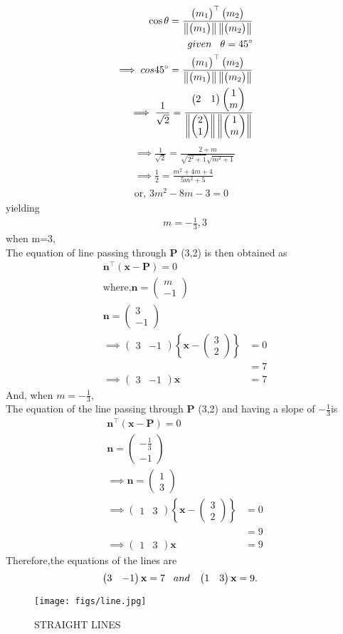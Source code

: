 \documentclass[10pt,a4paper]{report}
\newcommand{\myvec}[1]{\ensuremath{\begin{pmatrix}#1\end{pmatrix}}}
\let\vec\mathbf
\providecommand{\cbrak}[1]{\ensuremath{\left\{#1\right\}}}
\providecommand{\norm}[1]{\left\lVert#1\right\rVert}
\let\vec\mathbf
\renewcommand{\vec}[1]{\textbf{#1}}
\begin{document}
\begin{align}
\cos \theta = \frac{\myvec{m_1}^\top \myvec{m_2}}{\norm{\myvec{m_1}}\norm{\myvec{m_2}}}\\
given\hspace{0.3cm}  \theta = 45^\circ\\
\implies cos45^\circ =  \frac{\myvec{m_1}^\top \myvec{m_2}}{\norm{\myvec{m_1}}\norm{\myvec{m_2}}}\\
\implies \frac{1}{\sqrt{2}} = \frac{\myvec{2 & 1} \myvec{1\\m}}{\norm{\myvec{2\\1}}\norm{\myvec{1\\m}}}
\end{align}
\begin{align}
\implies \frac{1}{\sqrt{2}}=\frac{2+m}{\sqrt{2^2 + 1}\sqrt{m^2 + 1}}\\
\implies \frac{1}{2}=\frac{m^2 + 4m +4}{5m^2 +5}\\
\text{or, } 3m^2 - 8m -3 = 0
\end{align}
yielding
\begin{align}
m= - \frac{1}{3}, 3
\end{align} 
when m=3,\\
The equation of line passing through $\vec{P}$ (3,2) is then obtained as
\begin{align}
\vec{n}^{\top} ({\vec{x}-\vec{P}}) = 0\\
\text{where,}{\vec{n}}=\myvec{m\\-1} \\
{\vec{n}}=\myvec{3\\-1} \\
\implies 
	\myvec{3&-1}\cbrak{\vec{x}-\myvec{3\\2}}&=0\\
	&=7 \\
 \implies 	\myvec{3 & -1}\vec{x} &= 7
\end{align}
And, when $m=-\frac{1}{3}$,\\
The equation of the line passing through $\vec{P}$  (3,2) and having a slope of $-\frac{1}{3}$is
\begin{align}
\vec{n}^{\top} ({\vec{x}-\vec{P}}) = 0\\
{\vec{n}}=\myvec{-\frac{1}{3}\\-1} \\
\implies {\vec{n}}=\myvec{1\\3} \\
\implies 
	\myvec{1&3}\cbrak{\vec{x}-\myvec{3\\2}}&=0\\
	&=9 \\
		\implies 	\myvec{1 & 3}\vec{x} &= 9
\end{align}
Therefore,the equations of the lines are 
\begin{align}
  \myvec{3 & -1}\vec{x} &= 7  \hspace{0.3cm}and\hspace{0.3cm} \myvec{1 & 3}\vec{x} = 9 .
\end{align}
\begin{figure}[H]
\centering
\texttt{[image: figs/line.jpg]}
\caption{STRAIGHT LINES}
\label{fig:line.jpg}
\end{figure}
\end{document}
